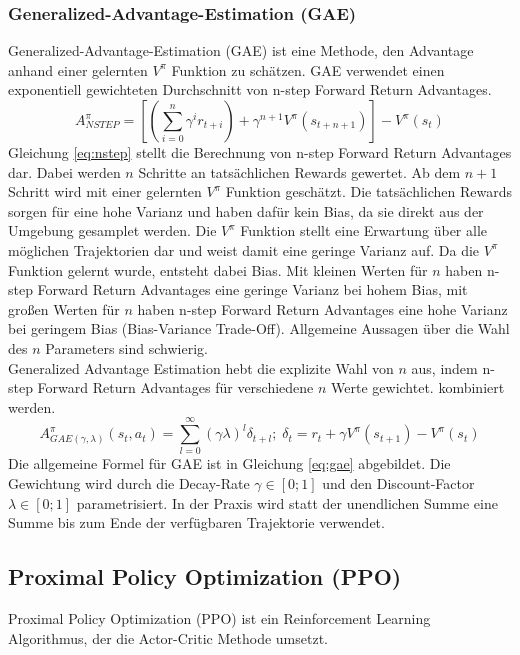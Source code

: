 \subsubsection{Generalized-Advantage-Estimation (GAE)}
Generalized-Advantage-Estimation (GAE) ist eine Methode, den Advantage anhand einer gelernten $V^\pi$ Funktion zu schätzen. GAE verwendet einen exponentiell gewichteten Durchschnitt von n-step Forward Return Advantages.
\begin{equation}
    A^\pi_{NSTEP} = \left[ (\sum_{i=0}^n \gamma^i r_{t+i}) + \gamma^{n+1} V^\pi (s_{t+n+1}) \right] - V^\pi(s_t)
    \label{eq:nstep}
\end{equation}
Gleichung \ref{eq:nstep} stellt die Berechnung von n-step Forward Return Advantages dar. Dabei werden $n$ Schritte an tatsächlichen Rewards gewertet. Ab dem $n+1$ Schritt wird mit einer gelernten $V^\pi$ Funktion geschätzt. Die tatsächlichen Rewards sorgen für eine hohe Varianz und haben dafür kein Bias, da sie direkt aus der Umgebung gesamplet werden. Die $V^\pi$ Funktion stellt eine Erwartung über alle möglichen Trajektorien dar und weist damit eine geringe Varianz auf. Da die $V^\pi$ Funktion gelernt wurde, entsteht dabei Bias. Mit kleinen Werten für $n$ haben n-step Forward Return Advantages eine geringe Varianz bei hohem Bias, mit großen Werten für $n$ haben n-step Forward Return Advantages eine hohe Varianz bei geringem Bias (Bias-Variance Trade-Off). Allgemeine Aussagen über die Wahl des $n$ Parameters sind schwierig.\\
Generalized Advantage Estimation hebt die explizite Wahl von $n$ aus, indem n-step Forward Return Advantages für verschiedene $n$ Werte gewichtet. kombiniert werden.
\begin{equation}
    A^\pi_{GAE(\gamma,\lambda)} (s_t,a_t) = \sum_{l=0}^\infty (\gamma\lambda)^l \delta_{t+l} ;\; \delta_t = r_t + \gamma V^\pi (s_{t+1}) - V^\pi(s_t)
    \label{eq:gae}
\end{equation}
Die allgemeine Formel für GAE ist in Gleichung \ref{eq:gae} abgebildet. Die Gewichtung wird durch die Decay-Rate $\gamma \in [0;1]$ und den Discount-Factor $\lambda \in [0;1]$ parametrisiert.
In der Praxis wird statt der unendlichen Summe eine Summe bis zum Ende der verfügbaren Trajektorie verwendet. \cite{gaePaper}


\subsection{Proximal Policy Optimization (PPO)}
Proximal Policy Optimization (PPO) ist ein Reinforcement Learning Algorithmus, der die Actor-Critic Methode umsetzt.

